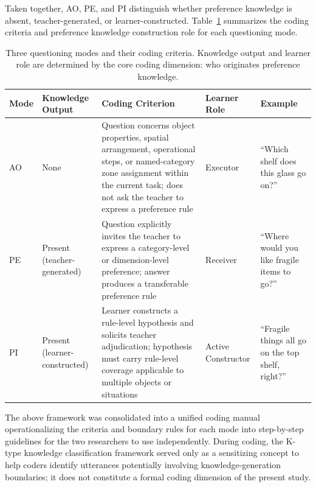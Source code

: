 \documentclass[manuscript,review,anonymous]{acmart}
\begin{document}
Taken together, AO, PE, and PI distinguish whether preference knowledge is absent, teacher-generated, or learner-constructed. Table~\ref{tab:questioning-modes} summarizes the coding criteria and preference knowledge construction role for each questioning mode.

\begin{table}[t]
\centering
\caption{Three questioning modes and their coding criteria. Knowledge output and learner role are determined by the core coding dimension: who originates preference knowledge.}
\label{tab:questioning-modes}
\small
\renewcommand{\arraystretch}{1.15}
\begin{tabularx}{\textwidth}{@{} >{\raggedright\arraybackslash}p{1.3cm} >{\raggedright\arraybackslash}p{2.7cm} >{\raggedright\arraybackslash}X >{\raggedright\arraybackslash}p{2.5cm} >{\raggedright\arraybackslash}p{3.6cm} @{}}
\toprule
\textbf{Mode} & \textbf{Knowledge Output} & \textbf{Coding Criterion} & \textbf{Learner Role} & \textbf{Example} \\
\midrule
AO & None &
Question concerns object properties, spatial arrangement, operational steps, or named-category zone assignment within the current task; does not ask the teacher to express a preference rule &
Executor &
``Which shelf does this glass go on?'' \\[4pt]
PE & Present (teacher-generated) &
Question explicitly invites the teacher to express a category-level or dimension-level preference; answer produces a transferable preference rule &
Receiver &
``Where would you like fragile items to go?'' \\[4pt]
PI & Present (learner-constructed) &
Learner constructs a rule-level hypothesis and solicits teacher adjudication; hypothesis must carry rule-level coverage applicable to multiple objects or situations &
Active Constructor &
``Fragile things all go on the top shelf, right?'' \\
\bottomrule
\end{tabularx}
\end{table}

The above framework was consolidated into a unified coding manual operationalizing the criteria and boundary rules for each mode into step-by-step guidelines for the two researchers to use independently. During coding, the K-type knowledge classification framework \citep{shin2023uncertainty} served only as a sensitizing concept to help coders identify utterances potentially involving knowledge-generation boundaries; it does not constitute a formal coding dimension of the present study.
\end{document}
